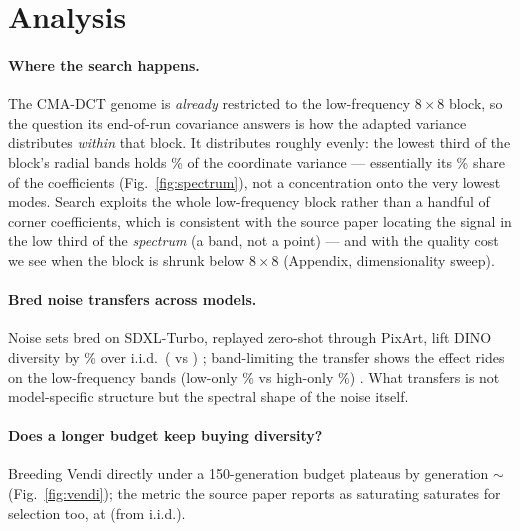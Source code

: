 \documentclass[10pt,twocolumn,letterpaper]{article}
\begin{document}
\section{Analysis}
\label{sec:analysis}

\ifdefined\nbCmaLowBandFrac
\paragraph{Where the search happens.} The CMA-DCT genome is \emph{already}
restricted to the low-frequency $8{\times}8$ block, so the question its
end-of-run covariance answers is how the adapted variance distributes
\emph{within} that block. It distributes roughly evenly: the lowest third of
the block's radial bands holds \nbCmaLowBandFrac\% of the coordinate variance
--- essentially its \nbCmaLowBandFrac\% share of the coefficients
(Fig.~\ref{fig:spectrum}), not a concentration onto the very lowest modes.
Search exploits the whole low-frequency block rather than a handful of corner
coefficients, which is consistent with the source paper locating the signal in
the low third of the \emph{spectrum} (a band, not a point) --- and with the
quality cost we see when the block is shrunk below $8{\times}8$
(Appendix, dimensionality sweep).
\fi

\ifdefined\nbTransferGainPct
\paragraph{Bred noise transfers across models.} Noise sets bred on SDXL-Turbo,
replayed zero-shot through PixArt, lift DINO diversity by
\nbTransferGainPct\% over i.i.d.\ (\nbTransferBredDino{} vs
\nbTransferIidDino)
\ifdefined\nbTransferLowGainPct
; band-limiting the transfer shows the effect rides on the low-frequency
bands (low-only \nbTransferLowGainPct\% vs high-only \nbTransferHighGainPct\%)
\fi
. What transfers is not model-specific structure but the spectral shape of
the noise itself.
\fi

\ifdefined\nbVendiPlateauGen
\paragraph{Does a longer budget keep buying diversity?} Breeding Vendi
directly under a 150-generation budget plateaus by generation
$\sim$\nbVendiPlateauGen{} (Fig.~\ref{fig:vendi}); the metric the source
paper reports as saturating saturates for selection too, at
\nbVendiLongBest{} (from \nbVendiLongInit{} i.i.d.).
\fi
\end{document}
